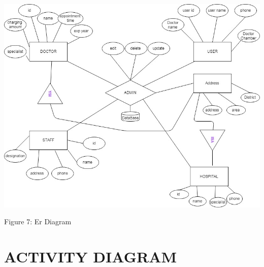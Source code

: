 \documentclass[12pt]{article}
\begin{document}
\includegraphics[scale = 0.45]{EE.jpg}\\[8.0 cm]
\begin{center}
 \caption{ Figure 7: Er Diagram}
    
\end{center}

\pagebreak

\section{ACTIVITY DIAGRAM}
\end{document}
